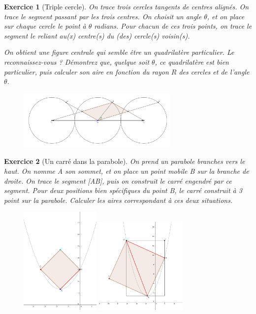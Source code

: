 \documentclass[12pt]{article}
\theoremstyle{break}
\newtheorem{exo}{Exercice}
\begin{document}
\begin{exo}[Triple cercle]
On trace trois cercles tangents de centres alignés. On trace le segment passant par les trois centres. On choisit un angle $\theta$, et on place sur chaque cercle le point à $\theta$ radians. Pour chacun de ces trois points, on trace le segment le reliant au(x) centre(s) du (des) cercle(s) voisin(s).

On obtient une figure centrale qui semble être un quadrilatère particulier. Le reconnaissez-vous ? Démontrez que, quelque soit $\theta$, ce quadrilatère est bien particulier, puis calculer son aire en fonction du rayon $R$ des cercles et de l'angle $\theta$.

\begin{figure}[h!]
	\centering
    \includegraphics[width=0.7\textwidth]{TripleCercle.png}
    
\end{figure}
\end{exo}


\begin{exo}[Un carré dans la parabole]
On prend un parabole branches vers le haut. On nomme A son sommet, et on place un point mobile B sur la branche de droite. On trace le segment [AB], puis on construit le carré engendré par ce segment. Pour deux positions bien spécifiques du point B, le carré construit à 3 point sur la parabole. Calculer les aires correspondant à ces deux situations.

\begin{figure}[h!]
	\centering
    \includegraphics[width=0.35\textwidth]{CarreParabole.png}
    \includegraphics[width=0.4\textwidth]{CarreParabole2.png}
\end{figure}
\end{exo}
\end{document}
